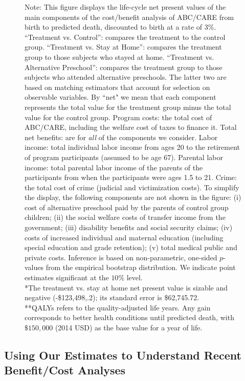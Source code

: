 \begin{figure}
Note: This figure displays the life-cycle net present values of the main components of the cost/benefit analysis of ABC/CARE from birth to predicted death, discounted to birth at a rate of 3\%. ``Treatment vs. Control'': compares the treatment to the control group. ``Treatment vs. Stay at Home'': compares the treatment group to those subjects who stayed at home. ``Treatment vs. Alternative Preschool'': compares the treatment group to those subjects who attended alternative preschools. The latter two are based on matching estimators that account for selection on observable variables. By ``net" we mean that each component represents the total value for the treatment group minus the total value for the control group. Program costs: the total cost of ABC/CARE, including the welfare cost of taxes to finance it. Total net benefits: are for \textit{all} of the components we consider. Labor income: total individual labor income from ages 20 to the retirement of program participants (assumed to be age 67). Parental labor income: total parental labor income of the parents of the participants from when the participants were ages 1.5 to 21. Crime: the total cost of crime (judicial and victimization costs). To simplify the display, the following components are not shown in the figure: (i) cost of alternative preschool paid by the parents of control group children; (ii) the social welfare costs of transfer income from the government; (iii) disability benefits and social security claims; (iv) costs of increased individual and maternal education (including special education and grade retention); (v) total medical public and private costs. Inference is based on non-parametric, one-sided $p$-values from the empirical bootstrap distribution. We indicate point estimates significant at the $10\%$ level.\\
*The treatment vs. stay at home net present value is sizable and negative (-\$123,498,.2); its standard error is \$62,745.72.\\
**QALYs refers to the quality-adjusted life years. Any gain corresponds to better health conditions until predicted death, with $\$150,000$ (2014 USD) as the base value for a year of life.\\
\end{figure}

\subsection{Using Our Estimates to Understand Recent Benefit/Cost Analyses}\label{appendix:bcaestimates}

